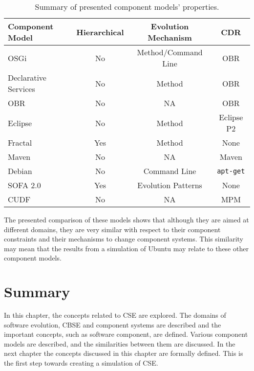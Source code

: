 \begin{table}
\begin{tabular}{|l || c | c | c | }
\hline \textbf{Component Model}& \textbf{Hierarchical}& \textbf{Evolution Mechanism}	& \textbf{CDR}\\\hline

OSGi					& No			& Method/Command Line 					& OBR\\
Declarative Services	& No			& Method 								& OBR\\
OBR						& No			& NA									& OBR \\
Eclipse					& No			& Method								& Eclipse P2\\
Fractal					& Yes			& Method 								& None\\
Maven					& No			& NA 									& Maven\\
Debian					& No			& Command Line 							& \texttt{apt-get}\\
SOFA 2.0				& Yes			& Evolution Patterns 					& None\\
CUDF					& No			& NA 									& MPM\\\hline
\end{tabular}
\caption{Summary of presented component models' properties.}
\label{background.comparisonprop}
\end{table}

The presented comparison of these models shows that although they are aimed at different domains, 
they are very similar with respect to their component constraints and their mechanisms to change component systems.
This similarity may mean that the results from a simulation of Ubuntu may relate to these other component models. 

\section{Summary}
In this chapter, the concepts related to CSE are explored.
The domains of software evolution, CBSE and component systems are described and the important concepts, such as software component, are defined.
Various component models are described, and the similarities between them are discussed.
In the next chapter the concepts discussed in this chapter are formally defined. 
This is the first step towards creating a simulation of CSE.

